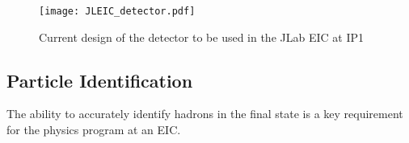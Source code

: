 \begin{figure}
	\centering
	\texttt{[image: JLEIC\_detector.pdf]}
	\caption{Current design of the detector to be used in the JLab EIC at IP1}
	\label{fig:jleic_detector}
\end{figure}

\subsection{Particle Identification}
The ability to accurately identify hadrons in the final state is a key requirement for the physics program at an EIC.